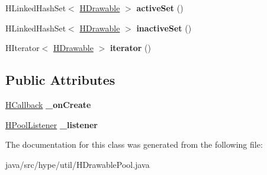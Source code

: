 \begin{DoxyCompactItemize}
\item 
\hypertarget{classhype_1_1util_1_1_h_drawable_pool_a8326e4bd816cc062c2ed3f0535b78026}{H\-Linked\-Hash\-Set$<$ \hyperlink{classhype_1_1drawable_1_1_h_drawable}{H\-Drawable} $>$ {\bfseries active\-Set} ()}\label{classhype_1_1util_1_1_h_drawable_pool_a8326e4bd816cc062c2ed3f0535b78026}

\item 
\hypertarget{classhype_1_1util_1_1_h_drawable_pool_a3b6820ee8be2d8416d252f701f41eb3b}{H\-Linked\-Hash\-Set$<$ \hyperlink{classhype_1_1drawable_1_1_h_drawable}{H\-Drawable} $>$ {\bfseries inactive\-Set} ()}\label{classhype_1_1util_1_1_h_drawable_pool_a3b6820ee8be2d8416d252f701f41eb3b}

\item 
\hypertarget{classhype_1_1util_1_1_h_drawable_pool_aa3327f969773d3a77239a955e2ae1274}{H\-Iterator$<$ \hyperlink{classhype_1_1drawable_1_1_h_drawable}{H\-Drawable} $>$ {\bfseries iterator} ()}\label{classhype_1_1util_1_1_h_drawable_pool_aa3327f969773d3a77239a955e2ae1274}

\end{DoxyCompactItemize}
\subsection*{Public Attributes}
\begin{DoxyCompactItemize}
\item 
\hypertarget{classhype_1_1util_1_1_h_drawable_pool_acd09bbc8813c3fab35dd5495ba443873}{\hyperlink{interfacehype_1_1interfaces_1_1_h_callback}{H\-Callback} {\bfseries \-\_\-on\-Create}}\label{classhype_1_1util_1_1_h_drawable_pool_acd09bbc8813c3fab35dd5495ba443873}

\item 
\hypertarget{classhype_1_1util_1_1_h_drawable_pool_af89c46b9354c43572322ecfef05be36d}{\hyperlink{interfacehype_1_1interfaces_1_1_h_pool_listener}{H\-Pool\-Listener} {\bfseries \-\_\-listener}}\label{classhype_1_1util_1_1_h_drawable_pool_af89c46b9354c43572322ecfef05be36d}

\end{DoxyCompactItemize}


The documentation for this class was generated from the following file\-:\begin{DoxyCompactItemize}
\item 
java/src/hype/util/H\-Drawable\-Pool.\-java\end{DoxyCompactItemize}
